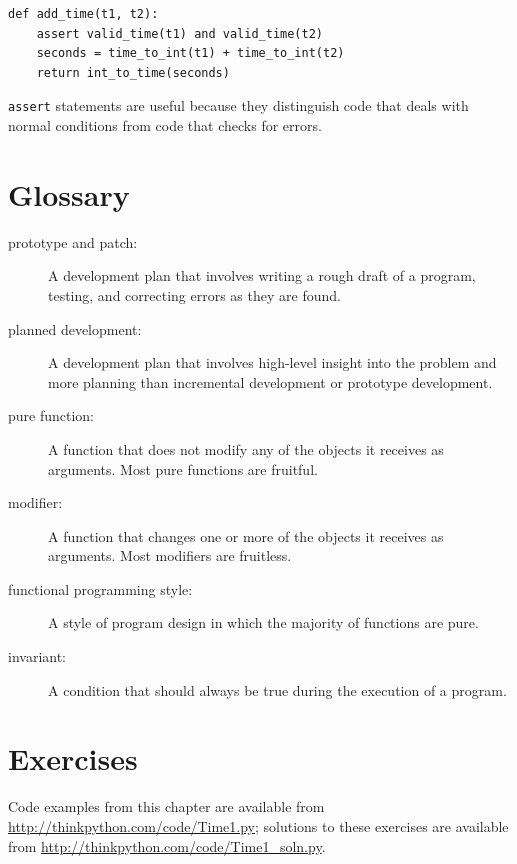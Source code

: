 \documentclass[12pt,a4paper,final,twoside,onecolumn,titlepage]{book}
\begin{document}
\begin{verbatim}
def add_time(t1, t2):
    assert valid_time(t1) and valid_time(t2)
    seconds = time_to_int(t1) + time_to_int(t2)
    return int_to_time(seconds)
\end{verbatim}
%
{\tt assert} statements are useful because they distinguish
code that deals with normal conditions from code
that checks for errors.


\section{Glossary}

\begin{description}

\item[prototype and patch:] A development plan that involves
writing a rough draft of a program, testing, and correcting errors as
they are found.

\item[planned development:] A development plan that involves
high-level insight into the problem and more planning than incremental
development or prototype development.

\item[pure function:] A function that does not modify any of the objects it
receives as arguments.  Most pure functions are fruitful.

\item[modifier:] A function that changes one or more of the objects it
receives as arguments.  Most modifiers are fruitless.

\item[functional programming style:] A style of program design in which the
majority of functions are pure.

\item[invariant:] A condition that should always be true during the
execution of a program.

\end{description}


\section{Exercises}

Code examples from this chapter are available from
\url{http://thinkpython.com/code/Time1.py}; solutions to these
exercises are available from \url{http://thinkpython.com/code/Time1_soln.py}.
\end{document}
